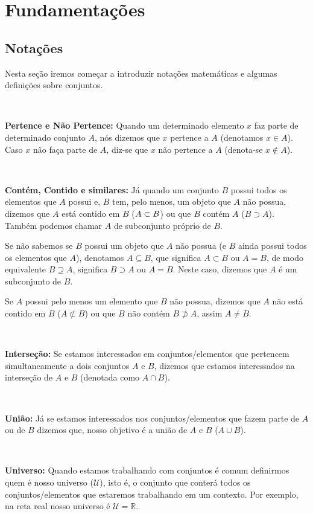 \section{Fundamentações}
\subsection{Notações}
Nesta seção iremos começar a introduzir notações matemáticas e algumas definições sobre conjuntos.

$\qquad$

\textbf{Pertence e Não Pertence:} Quando um determinado elemento $x$ faz parte de determinado conjunto $A$, nós dizemos que $x$ pertence a $A$ (denotamos $x \in A$). Caso $x$ não faça parte de $A$, diz-se que $x$ não pertence a $A$ (denota-se  $x \notin A$).

$\qquad$

\textbf{Contém, Contido e similares:} Já quando um conjunto $B$ possui todos os elementos que $A$ possui e, $B$ tem, pelo menos, um objeto que $A$ não possua, dizemos que $A$ está contido em $B$ ($\space A \subset B$) ou que $B$ contém $A$ ($B \supset A$).  Também podemos chamar $A$ de subconjunto próprio de $B$.

Se não sabemos se $B$ possui um objeto que $A$ não possua (e $B$ ainda possui todos os elementos que $A$), denotamos $A \subseteq B$, que significa $A \subset B$ ou $A=B$, de modo equivalente $B \supseteq A$, significa $B \supset A$ ou $A=B$. Neste caso, dizemos que $A$ é um subconjunto de $B$.

Se $A$ possui pelo menos um elemento que $B$ não possua, dizemos que $A$ não está contido em $B$ ($A \not\subset B$) ou que $B$ não contém $B\not\supset A$, assim $A \neq B$.

$\qquad$

\textbf{Interseção:} Se estamos interessados em conjuntos/elementos que pertencem simultaneamente a dois conjuntos $A$ e $B$, dizemos que estamos interessados na interseção de $A$ e $B$ (denotada como $A \cap B$).

$\qquad$

\textbf{União:} Já se estamos interessados nos conjuntos/elementos que fazem parte de $A$ ou de $B$ dizemos que, nosso objetivo é a união de $A$ e $B$ ($A \cup B$).

$\qquad$

\textbf{Universo:} Quando estamos trabalhando com conjuntos é comum definirmos quem é nosso universo ($ \mathcal U $), isto é, o conjunto que conterá todos os conjuntos/elementos que estaremos trabalhando em um contexto. Por exemplo, na reta real nosso universo é $\mathcal U = \mathbb{R}$.

